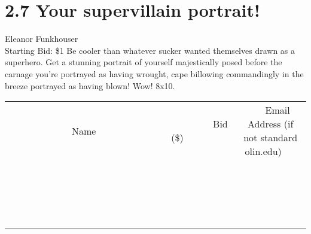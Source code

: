 \documentclass[11pt]{article}
\begin{document}
\section*{2.7 Your supervillain portrait!}
Eleanor Funkhouser
\\
Starting Bid: \$1
\newline
Be cooler than whatever sucker wanted themselves drawn as a superhero. Get a stunning portrait of yourself majestically posed before the carnage you're portrayed as having wrought, cape billowing commandingly in the breeze portrayed as having blown! Wow! 8x10.
\\[3ex]
\begin{tabular}{c c c}
~~~~~~~~~~~~~Name~~~~~~~~~~~~~ & ~~~~~~~~~Bid (\$)~~~~~~~~~  & ~~~Email Address (if not standard olin.edu)~~~\\
 & & \\
\hline
 & & \\
\hline
 & & \\
\hline
 & & \\
\hline
 & & \\
\hline
 & & \\
\hline
 & & \\
\hline
 & & \\
\hline
 & & \\
\hline
 & & \\
\hline
 & & \\
\hline
 & & \\
\hline
 & & \\
\hline
 & & \\
\hline
 & & \\
\hline
 & & \\
\hline
 & & \\
\hline
 & & \\
\hline
 & & \\
\hline
\end{tabular}
\newpage
\end{document}
